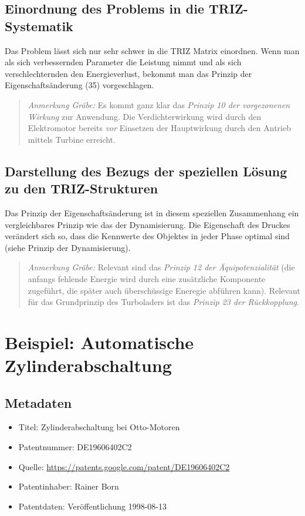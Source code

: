 \documentclass[11pt,a4paper]{article}
\newcommand{\HGG}[1]{\begin{quote} \emph{Anmerkung Gräbe:} #1  \end{quote}}
\begin{document}
\subsection{Einordnung des Problems in die TRIZ-Systematik}
Das Problem lässt sich nur sehr schwer in die TRIZ Matrix einordnen. Wenn man
als sich verbessernden Parameter die Leistung nimmt und als sich
verschlechternden den Energieverlust, bekommt man das Prinzip der
Eigenschaftsänderung (35) vorgeschlagen.

\HGG{Es kommt ganz klar das \emph{Prinzip 10 der vorgezonenen Wirkung} zur
  Anwendung.  Die Verdichterwirkung wird durch den Elektromotor bereits
  \emph{vor} Einsetzen der Hauptwirkung durch den Antrieb mittels Turbine
  erreicht.} 

\subsection{Darstellung des Bezugs der speziellen Lösung zu den
  TRIZ-Strukturen}

Das Prinzip der Eigenschaftsänderung ist in diesem speziellen Zusammenhang ein
vergleichbares Prinzip wie das der Dynamisierung. Die Eigenschaft des Druckes
verändert sich so, dass die Kennwerte des Objektes in jeder Phase optimal
sind (siehe Prinzip der Dynamisierung).

\HGG{Relevant sind das \emph{Prinzip 12 der Äquipotenzialität} (die anfangs
  fehlende Energie wird durch eine zusätzliche Komponente zugeführt, die
  später auch überschüssige Eneregie abführen kann).  Relevant für das
  Grundprinzip des Turboladers ist das \emph{Prinzip 23 der Rückkopplung}.}

\section{Beispiel: Automatische Zylinderabschaltung}
\subsection{Metadaten}
\begin{itemize}\itemsep0pt
\item Titel: Zylinderabschaltung bei Otto-Motoren
\item Patentnummer: DE19606402C2
\item Quelle: \url{https://patents.google.com/patent/DE19606402C2}
\item Patentinhaber:  Rainer Born 
\item Patentdaten: Veröffentlichung 1998-08-13
\end{itemize}
\end{document}
